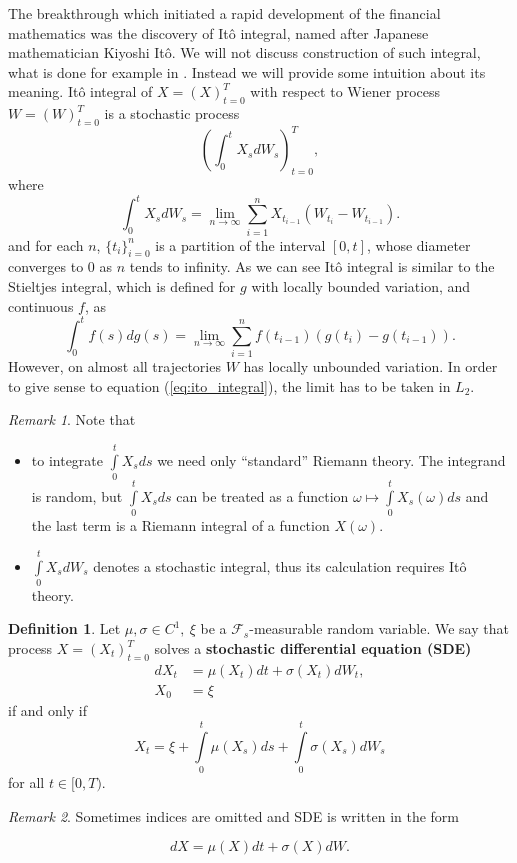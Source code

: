 \documentclass[a4paper,11pt, twoside]{book}
\theoremstyle{definition}
\newtheorem{mydef}{Definition}[chapter]
\theoremstyle{remark}
\newtheorem{remark}{Remark}[chapter]
\newcounter{example}[chapter]
\begin{document}
The breakthrough which initiated a rapid development of the financial mathematics was the discovery of It\^{o} integral, named after Japanese mathematician Kiyoshi It\^{o}. We will not discuss construction of such integral, what is done for example in \cite{latala}.
Instead we will provide some intuition about its meaning. It\^{o} integral of $X=(X)_{t=0}^T$ with respect to Wiener process $W=(W)_{t=0}^T$ is a stochastic process
\[ \left( \int_0^{t} X_s dW_s \right)_{t = 0}^T, \]
where
\begin{equation}
 \label{eq:ito_integral}
  \int_0^{t} X_s dW_s = \lim_{n \rightarrow \infty} \sum\limits_{i=1}^n X_{t_{i-1}} (W_{t_i} - W_{t_{i-1}}).
\end{equation}
and for each $n$, $\{t_i\}_{i=0}^n$ is a partition of the interval $[0,t]$, whose diameter converges to 0 as $n$ tends to infinity.
As we can see It\^{o} integral is similar to the Stieltjes integral, which is defined for $g$ with locally bounded variation, and continuous $f$, as
\[  \int_0^{t} f(s) dg(s) = \lim_{n \rightarrow \infty} \sum\limits_{i=1}^n f(t_{i-1}) (g(t_i) - g(t_{i-1})). \]
However, on almost all trajectories $W$ has locally unbounded variation. In order to give sense to equation (\ref{eq:ito_integral}), the limit has to be taken in $L_2$.

\begin{remark} Note that
\begin{itemize}
 \item to integrate $\int\limits_0^t X_s ds$ we need only ``standard'' Riemann theory. The integrand is random, but $\int\limits_0^t X_s ds$ can be treated as a function $\omega \mapsto \int\limits_0^t X_s(\omega) ds$ and the last term is a Riemann integral of a function $X(\omega)$.
 \item $\int\limits_0^t X_s dW_s$ denotes a stochastic integral, thus its calculation requires It\^{o} theory.
\end{itemize}
\end{remark}


\begin{mydef}
\label{def:SDE}
 Let $\mu, \sigma \in C^1,\ \xi$ be a $\mathcal{F}_s$-measurable random variable. We say that process $X=(X_t)_{t=0}^T$ solves a \textbf{stochastic differential equation (SDE)}
 \begin{equation*}
 \begin{split}
   dX_t &= \mu(X_t)dt + \sigma(X_t) dW_t,\\
   X_0 &= \xi  
 \end{split}  
 \end{equation*}
 if and only if
 \[X_t = \xi + \int\limits_0^t \mu(X_s)ds + \int\limits_0^t\sigma(X_s) dW_s\]
for all $t \in [0,T)$.
\end{mydef}
\begin{remark}
 Sometimes indices are omitted and SDE is written in the form
\end{remark}
\[ dX = \mu(X)dt + \sigma(X) dW. \]
\end{document}
